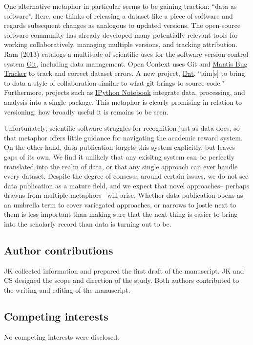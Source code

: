 \documentclass[10pt,a4paper,twocolumn]{article}
\begin{document}
{One alternative metaphor in particular seems to be gaining traction: ``data as software''\cite{schopf_treating_2012}.
Here, one thinks of releasing a dataset like a piece of software and regards subsequent changes as analogous to updated versions.
The open-source software community has already developed many potentially relevant tools for working collaboratively, managing multiple versions, and tracking attribution.
Ram (2013)\cite{ram_git_2013} catalogs a multitude of scientific uses for the software version control system \href{http://git-scm.com/}{Git}, including data management.
Open Context uses Git and \href{http://www.mantisbt.org/}{Mantis Bug Tracker} to track and correct dataset errors.
A new project, \href{http://dat-data.com/}{Dat}, ``aim[s] to bring to data a style of collaboration similar to what git brings to source code.''
Furthermore, projects such as \href{http://ipython.org/notebook}{IPython Notebook} integrate data, processing, and analysis into a single package.
This metaphor is clearly promising in relation to versioning; how broadly useful it is remains to be seen.

Unfortunately, scientific software struggles for recognition\cite{pradal_publishing_2013} just as data does, so that metaphor offers little guidance for navigating the academic reward system.
On the other hand, data publication targets this system explicitly, but leaves gaps of its own.
We find it unlikely that any exisitng system can be perfectly translated into the realm of data, or that any single approach can ever handle every dataset. 
Despite the degree of consesus around certain issues, we do not see data publication as a mature field, and we expect that novel approaches-- perhaps drawns from multiple metaphors-- will arise.
Whether data publication opens as an umbrella term to cover variegated approaches, or narrows to jostle next to them is less important than making sure that the next thing is easier to bring into the scholarly record than data is turning out to be.


\subsection*{Author contributions}
JK collected information and prepared the first draft of the manuscript.
JK and CS designed the scope and direction of the study.
Both authors contributed to the writing and editing of the manuscript.

\subsection*{Competing interests}
No competing interests were disclosed.

}
\end{document}

